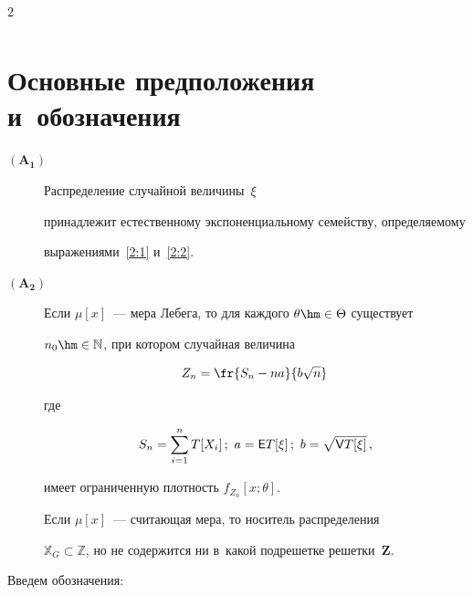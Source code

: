 \begin{multicols}{2}
\begin{multline}
 \label{2:2}


 \end{multline}








\section{Основные предположения и~обозначения}





  \begin{description}


  \item[$\mathbf{(A_1)}$] Распределение случайной величины~$\xi$


  принадлежит естественному экспоненциальному семейству, определяемому


  выражениями~\eqref{2:1} и~\eqref{2:2}.


  \item[$\mathbf{(A_2)}$]


 Если $\mu[x]$~--- мера Лебега, то для каждого $\theta\hm\in \Theta$ существует


 $n_0\hm\in \mathbb{N}$, при котором случайная величина


  $$


  Z_n=\fr{S_n-n a}{b\sqrt{n}}\,


  $$


  где


  $$


  S_n=\sum\limits^n_{i=1}T[X_i]\,; \ a=\Ep T[\xi]\,;\ b=\sqrt{\Vp T[\xi]}\,,


  $$


 имеет ограниченную плотность $f_{Z_n}[x;\theta]$.


 Если $\mu[x]$~--- считающая мера, то носитель распределения 


 $\mathbb{X}_G\subset \mathbb{Z}$, но не содержится ни в~какой подрешетке решетки~$\mathbf{Z}$.


 \end{description}








  Введем обозначения:


\begin{description}


\item[\,]



\end{description}
\end{multicols}
